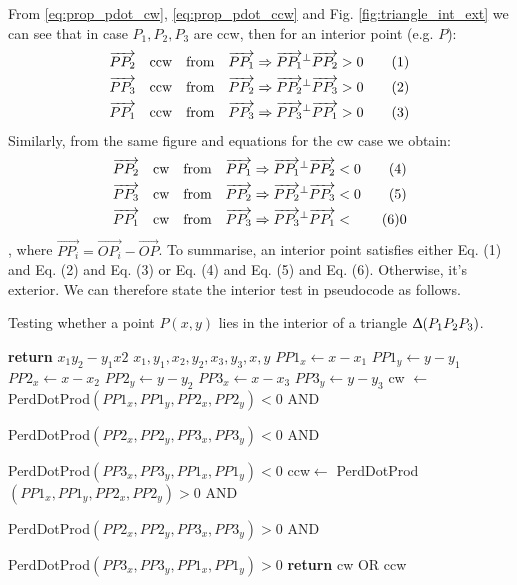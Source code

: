 \documentclass[a4paper]{article}
\begin{document}
From \eqref{eq:prop_pdot_cw}, \eqref{eq:prop_pdot_ccw} and Fig. \ref{fig:triangle_int_ext} we can see that in case $P_1,P_2,P_3$ are ccw, then for an interior point (e.g. $P$):
\begin{align*}
    \overrightarrow{PP_2} \quad \textup{ccw} \quad \textup{from} \quad \overrightarrow{PP_1} \Rightarrow \overrightarrow{PP_1}^{\bot}\overrightarrow{PP_2} > 0 \tag{1} \\
    \overrightarrow{PP_3} \quad \textup{ccw} \quad \textup{from} \quad \overrightarrow{PP_2} \Rightarrow \overrightarrow{PP_2}^{\bot}\overrightarrow{PP_3} > 0 \tag{2} \\
    \overrightarrow{PP_1} \quad \textup{ccw} \quad \textup{from} \quad \overrightarrow{PP_3} \Rightarrow \overrightarrow{PP_3}^{\bot}\overrightarrow{PP_1} > 0 \tag{3}
\end{align*}
Similarly, from the same figure and equations  for the cw case we obtain:
\begin{align*}
    \overrightarrow{PP_2} \quad \textup{cw} \quad \textup{from} \quad \overrightarrow{PP_1} \Rightarrow \overrightarrow{PP_1}^{\bot}\overrightarrow{PP_2} < 0 \tag{4} \\
    \overrightarrow{PP_3} \quad \textup{cw} \quad \textup{from} \quad \overrightarrow{PP_2} \Rightarrow \overrightarrow{PP_2}^{\bot}\overrightarrow{PP_3} < 0 \tag{5} \\
    \overrightarrow{PP_1} \quad \textup{cw} \quad \textup{from} \quad \overrightarrow{PP_3} \Rightarrow \overrightarrow{PP_3}^{\bot}\overrightarrow{PP_1} <  \tag{6}0
\end{align*}
, where $\overrightarrow{PP_i} = \overrightarrow{OP_i} - \overrightarrow{OP}$. To summarise, an interior point satisfies either Eq. (1) and Eq. (2) and Eq. (3) or Eq. (4) and Eq. (5) and Eq. (6). Otherwise, it's exterior. We can therefore state the interior test in pseudocode as follows.
\begin{algorithm}[H]
\caption{Testing whether a point $P(x,y)$ lies in the interior of a triangle $\Updelta(P_1P_2P_3)$.}
\begin{algorithmic}[1]
\State \textbf{return} $x_1y_2 - y_1x2$
\State
\EndProcedure
{} {$x_1,y_1,x_2,y_2,x_3,y_3,x,y$}
\State $PP1_x \leftarrow x - x_1$ 
\State $PP1_y \leftarrow y - y_1$
\State $PP2_x \leftarrow x - x_2$
\State $PP2_y \leftarrow y - y_2$
\State $PP3_x \leftarrow x - x_3$
\State $PP3_y \leftarrow y - y_3$
\State cw $\leftarrow$ PerdDotProd$(PP1_x,PP1_y,PP2_x,PP2_y) < 0$ AND

\quad PerdDotProd$(PP2_x,PP2_y,PP3_x,PP3_y) < 0$ AND

\quad PerdDotProd$(PP3_x,PP3_y,PP1_x,PP1_y) < 0$
\State ccw$\leftarrow$ PerdDotProd$(PP1_x,PP1_y,PP2_x,PP2_y) > 0$ AND 

\quad PerdDotProd$(PP2_x,PP2_y,PP3_x,PP3_y) > 0$ AND

\quad PerdDotProd$(PP3_x,PP3_y,PP1_x,PP1_y) > 0$
\State \textbf{return} cw OR ccw 
\EndProcedure
\end{algorithmic}
\label{alg:triangle_fill_int_test}
\end{algorithm}
\end{document}
